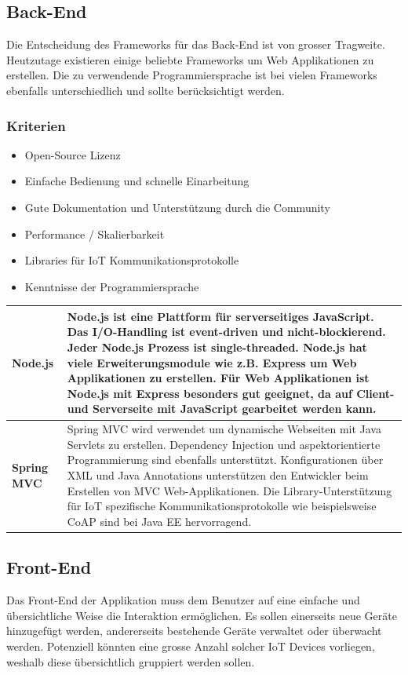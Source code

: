 \subsection{Back-End}
Die Entscheidung des Frameworks für das Back-End ist von grosser Tragweite. Heutzutage existieren einige beliebte Frameworks um Web Applikationen zu erstellen. Die zu verwendende Programmiersprache ist bei vielen Frameworks ebenfalls unterschiedlich und sollte berücksichtigt werden.

\subsubsection{Kriterien}
\begin{itemize}
\item Open-Source Lizenz
\item Einfache Bedienung und schnelle Einarbeitung
\item Gute Dokumentation und Unterstützung durch die Community
\item Performance / Skalierbarkeit
\item Libraries für IoT Kommunikationsprotokolle
\item Kenntnisse der Programmiersprache
\end{itemize}

\begin{longtable}{| p{4cm} | p{11.7cm} |}
 \hline
  \textbf{Node.js} & Node.js ist eine Plattform für serverseitiges JavaScript. Das I/O-Handling ist event-driven und nicht-blockierend. Jeder Node.js Prozess ist single-threaded. Node.js hat viele Erweiterungsmodule wie z.B. Express um Web Applikationen zu erstellen. Für Web Applikationen ist Node.js mit Express besonders gut geeignet, da auf Client- und Serverseite mit JavaScript gearbeitet werden kann.\\ \hline 
 \textbf{Spring MVC} & Spring MVC wird verwendet um dynamische Webseiten mit Java Servlets zu erstellen. Dependency Injection und aspektorientierte Programmierung sind ebenfalls unterstützt. Konfigurationen über XML und Java Annotations unterstützen den Entwickler beim Erstellen von MVC Web-Applikationen. Die Library-Unterstützung für IoT spezifische Kommunikationsprotokolle wie beispielsweise CoAP sind bei Java EE hervorragend.\\ \hline 
\end{longtable}

\newpage
\subsection{Front-End}
Das Front-End der Applikation muss dem Benutzer auf eine einfache und übersichtliche Weise die Interaktion ermöglichen. Es sollen einerseits neue Geräte hinzugefügt werden, andererseits bestehende Geräte verwaltet oder überwacht werden. Potenziell könnten eine grosse Anzahl solcher IoT Devices vorliegen, weshalb diese übersichtlich gruppiert werden sollen.

